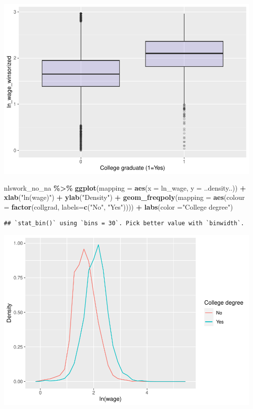 \documentclass[
]{article}
\newenvironment{Shaded}{\begin{snugshade}}{\end{snugshade}}
\newcommand{\AttributeTok}[1]{\textcolor[rgb]{0.13,0.29,0.53}{#1}}
\newcommand{\FunctionTok}[1]{\textcolor[rgb]{0.13,0.29,0.53}{\textbf{#1}}}
\newcommand{\NormalTok}[1]{#1}
\newcommand{\SpecialCharTok}[1]{\textcolor[rgb]{0.81,0.36,0.00}{\textbf{#1}}}
\newcommand{\StringTok}[1]{\textcolor[rgb]{0.31,0.60,0.02}{#1}}
\begin{document}
\includegraphics{RIntro_files/figure-latex/unnamed-chunk-26-1.pdf}

\begin{Shaded}
\begin{Highlighting}[]
\NormalTok{nlswork\_no\_na }\SpecialCharTok{\%\textgreater{}\%} \FunctionTok{ggplot}\NormalTok{(}\AttributeTok{mapping =} \FunctionTok{aes}\NormalTok{(}\AttributeTok{x =}\NormalTok{ ln\_wage, }\AttributeTok{y =}\NormalTok{ ..density..)) }\SpecialCharTok{+}
    \FunctionTok{xlab}\NormalTok{(}\StringTok{"ln(wage)"}\NormalTok{) }\SpecialCharTok{+}
    \FunctionTok{ylab}\NormalTok{(}\StringTok{"Density"}\NormalTok{) }\SpecialCharTok{+}
    \FunctionTok{geom\_freqpoly}\NormalTok{(}\AttributeTok{mapping =} \FunctionTok{aes}\NormalTok{(}\AttributeTok{colour =} \FunctionTok{factor}\NormalTok{(collgrad, }\AttributeTok{labels=}\FunctionTok{c}\NormalTok{(}\StringTok{"No"}\NormalTok{, }\StringTok{"Yes"}\NormalTok{)))) }\SpecialCharTok{+}
  \FunctionTok{labs}\NormalTok{(}\AttributeTok{color =}\StringTok{"College degree"}\NormalTok{)}
\end{Highlighting}
\end{Shaded}

\begin{verbatim}
## `stat_bin()` using `bins = 30`. Pick better value with `binwidth`.
\end{verbatim}

\includegraphics{RIntro_files/figure-latex/unnamed-chunk-27-1.pdf}
\end{document}
